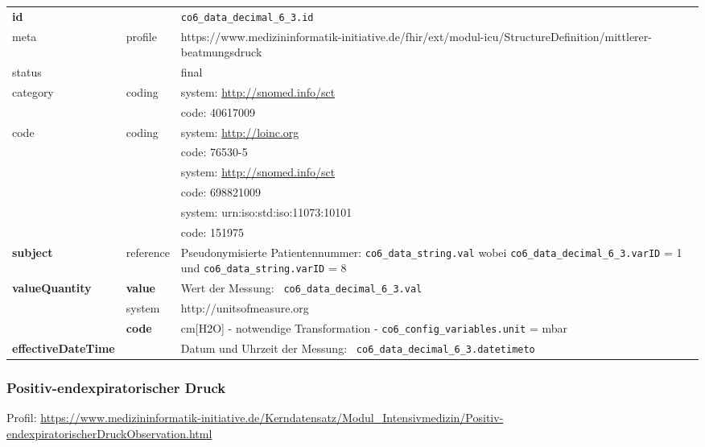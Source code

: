 \begin{longtable}{|l|l|p{7.5cm}|}
	\hline
	\rowcolor{lightgray} \multicolumn{3}{|l|}{Data Mapping (inhaltlich)} \\ \hline
	\textbf{id} &  & \texttt{co6\_data\_decimal\_6\_3.id} \\ \hline
	meta & profile & https://www.medizininformatik-initiative.de/fhir/ext/modul-icu/StructureDefinition/mittlerer-beatmungsdruck \\ \hline 
	status &  & final   \\ \hline 
	category & coding & system: \url{http://snomed.info/sct} \\
	\cline{3-3}
	& & code: 40617009 \\ \hline
	code & coding & system: \url{http://loinc.org} \\ 
	\cline{3-3} 
	&  & code: 76530-5 \\ 
	\cline{3-3} 
	&  & system: \url{http://snomed.info/sct} \\ 
	\cline{3-3}
	&  & code: 698821009 \\ 
	\cline{3-3} 
	&  & system: urn:iso:std:iso:11073:10101 \\ 
	\cline{3-3}
	&  & code: 151975 \\ \hline
	\textbf{subject} & reference & Pseudonymisierte Patientennummer: \texttt{co6\_data\_string.val} wobei \texttt{co6\_data\_decimal\_6\_3.varID} = 1 und \texttt{co6\_data\_string.varID} = 8 \\ \hline
	\textbf{valueQuantity}  & \textbf{value} & Wert der Messung: \texttt{
		co6\_data\_decimal\_6\_3.val} \\
	\cline{2-3}
	& system & http://unitsofmeasure.org \\
	\cline{2-3}
	& \textbf{code} & cm[H2O] - notwendige Transformation - \texttt{co6\_config\_variables.unit} = mbar \\ \hline
	\textbf{effectiveDateTime}  & & Datum und Uhrzeit der Messung: \texttt{
		co6\_data\_decimal\_6\_3.datetimeto} \\ \hline
\end{longtable}

\subsubsection{Positiv-endexpiratorischer Druck} 

Profil: \url{https://www.medizininformatik-initiative.de/Kerndatensatz/Modul_Intensivmedizin/Positiv-endexpiratorischerDruckObservation.html}

